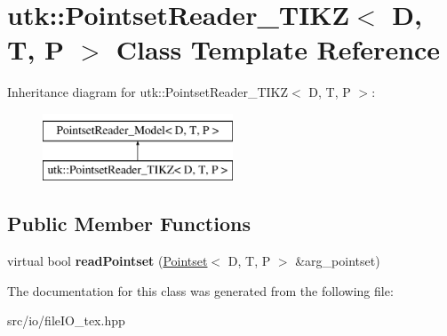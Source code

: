 \hypertarget{classutk_1_1PointsetReader__TIKZ}{\section{utk\-:\-:Pointset\-Reader\-\_\-\-T\-I\-K\-Z$<$ D, T, P $>$ Class Template Reference}
\label{classutk_1_1PointsetReader__TIKZ}
}
Inheritance diagram for utk\-:\-:Pointset\-Reader\-\_\-\-T\-I\-K\-Z$<$ D, T, P $>$\-:\begin{figure}[H]
\begin{center}
\leavevmode
\includegraphics[height=2.000000cm]{classutk_1_1PointsetReader__TIKZ}
\end{center}
\end{figure}
\subsection*{Public Member Functions}
\begin{DoxyCompactItemize}
\item 
\hypertarget{classutk_1_1PointsetReader__TIKZ_a9bbb17d1af1265ad36a3b4ead17f156c}{virtual bool {\bfseries read\-Pointset} (\hyperlink{classutk_1_1Pointset}{Pointset}$<$ D, T, P $>$ \&arg\-\_\-pointset)}\label{classutk_1_1PointsetReader__TIKZ_a9bbb17d1af1265ad36a3b4ead17f156c}

\end{DoxyCompactItemize}


The documentation for this class was generated from the following file\-:\begin{DoxyCompactItemize}
\item 
src/io/file\-I\-O\-\_\-tex.\-hpp\end{DoxyCompactItemize}

